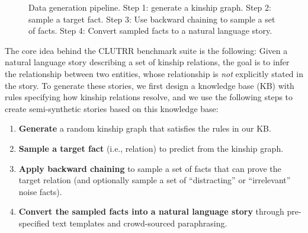 \documentclass[letterpaper, 12pt]{report}
\begin{document}
\begin{figure}[t]
\centering
{}
\caption{Data generation pipeline. Step 1: generate a kinship graph. Step 2: sample a target fact. Step 3: Use backward chaining to sample a set of facts. Step 4: Convert sampled facts to a natural language story.}
\label{fig:clutrr:data}
\end{figure}


The core idea behind the CLUTRR benchmark suite is the following: Given a natural language story describing a set of kinship relations, the goal is to infer the relationship between two entities, whose relationship is {\em not} explicitly stated in the story.
To generate these stories, we first design a knowledge base (KB) with rules specifying how kinship relations resolve, and we use the following steps to create semi-synthetic stories based on this knowledge base:
\begin{enumerate}[topsep=3pt, parsep=6pt, leftmargin=40pt, itemsep=0pt, label={\bf Step \arabic*.}]
    \item \textbf{Generate} a random kinship graph that satisfies the rules in our KB.
    \item
        \textbf{Sample a target fact} (i.e., relation) to predict from the kinship graph.
    \item
        \textbf{Apply backward chaining} to sample a set of facts that can prove the target relation (and optionally sample a set of ``distracting'' or ``irrelevant'' noise facts).
    \item
        \textbf{Convert the sampled facts into a natural language story} through pre-specified text templates and crowd-sourced paraphrasing.
\end{enumerate}
\end{document}
